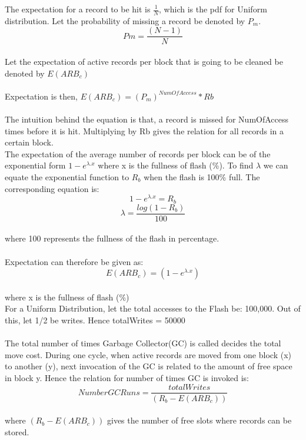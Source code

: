 \documentclass[11pt]{article} %
\begin{document}
The expectation for a record to be hit is $\frac{1}{N}$, which is the pdf for Uniform distribution. Let the probability of missing a record be denoted by $P_m$. 
\begin{equation}Pm = \frac{(N-1)}{N}\end{equation}\\
Let the expectation of active records per block that is going to be cleaned be denoted by $E(ARB_c)$\\
\\

Expectation is then, $E(ARB_c) = (P_m)^{NumOfAccess} * Rb$\\
\\
The intuition behind the equation is that, a record is missed for NumOfAccess times before it is hit. Multiplying by Rb gives the relation for all records in a certain block.\\


The expectation of the average number of records per block can be of the exponential form $1-e^{\lambda . x}$ where x is the fullness of flash (\%). To find $\lambda$ we can equate the exponential function to $R_b$ when the flash is 100\% full. 
The corresponding equation is:
$$1-e^{\lambda . x} = R_b$$
$$\lambda = \frac{log(1 - R_b)}{100}$$\\
where 100 represents the fullness of the flash in percentage.\\
\\
Expectation can therefore be given as: $$E(ARB_c) = (1 - e^{\lambda . x})$$\\
where x is the fullness of flash (\%)
\\

For a Uniform Distribution, let the total accesses to the Flash be: 100,000. Out of this, let 1/2 be writes. Hence totalWrites = 50000\\
\\

The total number of times  Garbage Collector(GC) is called decides the total move cost. During one cycle, when active records are moved from one block (x) to another (y), next invocation of the GC is related to the amount of free space in block y. Hence the relation for number of times GC is invoked is:\\
\begin{equation}NumberGCRuns = \frac{totalWrites}{(R_b - E(ARB_c))}\end{equation}\\
where ${(R_b - E(ARB_c))}$ gives the number of free slots where records can be stored.\\
\\
\end{document}
